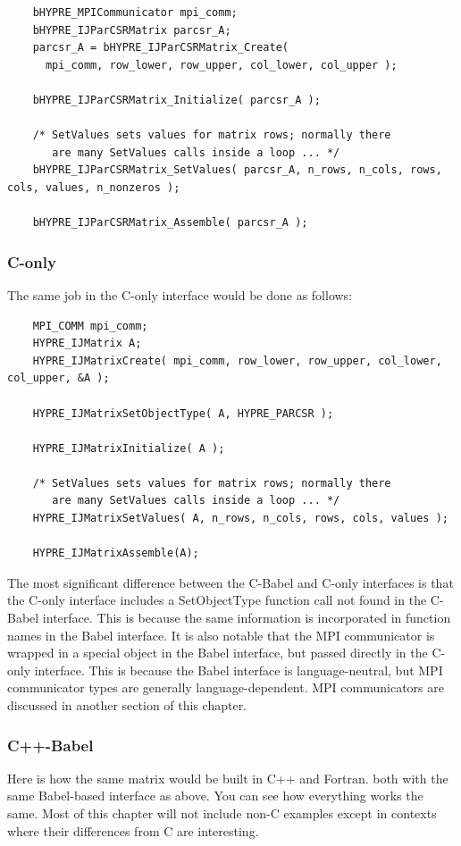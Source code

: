 \begin{verbatim}
    bHYPRE_MPICommunicator mpi_comm;
    bHYPRE_IJParCSRMatrix parcsr_A;
    parcsr_A = bHYPRE_IJParCSRMatrix_Create(
      mpi_comm, row_lower, row_upper, col_lower, col_upper );

    bHYPRE_IJParCSRMatrix_Initialize( parcsr_A );

    /* SetValues sets values for matrix rows; normally there
       are many SetValues calls inside a loop ... */
    bHYPRE_IJParCSRMatrix_SetValues( parcsr_A, n_rows, n_cols, rows, cols, values, n_nonzeros );

    bHYPRE_IJParCSRMatrix_Assemble( parcsr_A );
\end{verbatim}

\subsubsection{C-only}
The same job in the C-only interface would be done as follows:

\begin{verbatim}
    MPI_COMM mpi_comm;
    HYPRE_IJMatrix A;
    HYPRE_IJMatrixCreate( mpi_comm, row_lower, row_upper, col_lower, col_upper, &A );

    HYPRE_IJMatrixSetObjectType( A, HYPRE_PARCSR );

    HYPRE_IJMatrixInitialize( A );

    /* SetValues sets values for matrix rows; normally there
       are many SetValues calls inside a loop ... */
    HYPRE_IJMatrixSetValues( A, n_rows, n_cols, rows, cols, values );

    HYPRE_IJMatrixAssemble(A);
\end{verbatim}


The most significant difference between the C-Babel and C-only
interfaces is that the C-only interface includes a SetObjectType
function call not found in the C-Babel interface.  This is because the
same information is incorporated in function names in the Babel
interface.  It is also notable that the MPI communicator is wrapped in
a special object in the Babel interface, but passed directly in the
C-only interface.  This is because the Babel interface is
language-neutral, but MPI communicator types are generally
language-dependent.  MPI communicators are discussed in another
section of this chapter.

\subsubsection{C++-Babel}
Here is how the same matrix would be built in C++ and Fortran.
both with the same Babel-based interface as above.
You can see how everything works the same.  Most of this chapter
will not include non-C examples except in contexts where their differences
from C are interesting.

